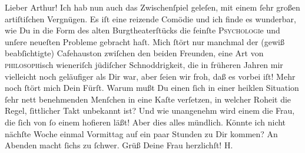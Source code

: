 \pstart{}Lieber Arthur!\pend\vspace{0.5em}
\pstart
           Ich hab nun auch das Zwischenſpiel geleſen, mit
               einem{ }ſehr großen artiſtiſchen Vergnügen. Es iſt eine reizende Comödie und ich finde
               es wunderbar, wie Du in die Form des alten Burgtheaterſtücks die feinſte \textsc{Psychologi}e und
               unſere neueſten Probleme gebracht haſt. Mich{ }ſtört nur manchmal der (gewiß
               beabſichtigte) Cafehauston zwiſchen den beiden Freunden, eine Art von \textsc{philosoph}isch wieneriſch
               jüdiſcher Schnoddrigkeit, die in früheren Jahren mir vielleicht noch geläufiger als
               Dir war, aber{ }ſeien wir froh, daß es vorbei iſt! Mehr noch{ }ſtört mich Dein Fürſt. Warum mußt Du einen{ }ſich
               in einer heiklen Situation{ }ſehr nett benehmenden Menſchen in eine Kaſte verſetzen, in
               welcher Roheit die Regel,{ }ſittlicher Takt unbekannt ist? Und wie unangenehm wird
               einem die Frau, die{ }ſich von{ }ſo einem hofieren läßt! Aber dies alles mündlich. Könnte
               ich nicht nächſte Woche einmal Vormittag auf ein paar Stunden zu Dir kommen? An
               Abenden macht{ }ſichs zu{ }ſchwer. Grüß Deine Frau herzlichſt! \spacefill\mbox{H.}\pend
           \endnumbering{}  \newcommand{\dateiname}{L01550}\newcommand{\titel}{Hermann Bahr an Arthur Schnitzler, 20. 9. 1905}\newcommand{\editorInnen}{Herausgegeben von Martin Anton Müller}
